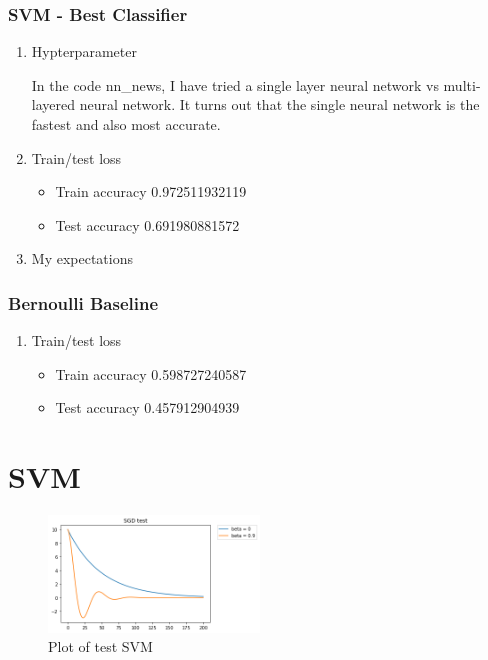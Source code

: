 \documentclass[letterpaper, 12]{article}
\begin{document}
\subsubsection{SVM - Best Classifier}
\begin{enumerate}

    \item Hypterparameter
	
	In the code nn\_news, I have tried a single layer neural network vs multi-layered neural network. It turns out that the single neural network is the fastest and also most accurate.

	\item Train/test loss
	\begin{itemize}
     \item  Train accuracy  0.972511932119
     \item Test accuracy 0.691980881572
        \end{itemize}
      \item My expectations
  
\end{enumerate}

\subsubsection{Bernoulli Baseline}
\begin{enumerate}
	\item Train/test loss
	\begin{itemize}
     \item  Train accuracy  0.598727240587
     \item Test accuracy 0.457912904939
        \end{itemize}
\end{enumerate}





\section{SVM}
\begin{figure}[H]
\centering
\includegraphics[width=0.5\textwidth]{q2part1plot.png}
\caption{\label{}Plot of test SVM}
\end{figure}
\end{document}

